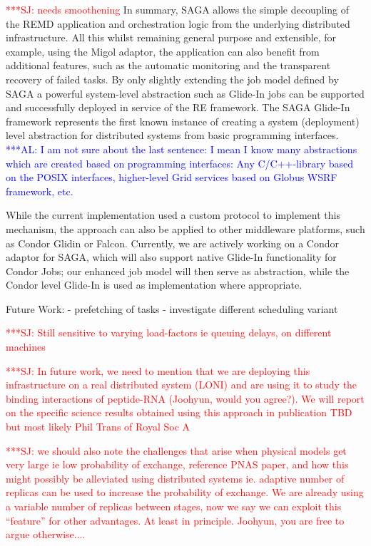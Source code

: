 \documentclass{rspublic}
\newcommand{\alnote}[1]{ {\textcolor{blue} { ***AL: #1 }}}
\newcommand{\jhanote}[1]{ {\textcolor{red} { ***SJ: #1 }}}
\newcommand{\alnote}[1]{}
\newcommand{\jhanote}[1]{}
\newcommand{\glidein}[1]{Glide-In }
\begin{document}
                                         
\jhanote{needs smoothening} In summary, SAGA allows the simple
decoupling of the REMD application and orchestration logic from the
underlying distributed infrastructure. All this whilst remaining
general purpose and extensible, for example, using the Migol adaptor,
the application can also benefit from additional features, such as the
automatic monitoring and the transparent recovery of failed tasks. By
only slightly extending the job model defined by SAGA a powerful
system-level abstraction such as \glidein\ jobs can be supported and
successfully deployed in service of the RE framework.  The SAGA
\glidein\ framework represents the first known instance of creating a
system (deployment) level abstraction for distributed systems from
basic programming interfaces.  \alnote{I am not sure about the last
  sentence: I mean I know many abstractions which are created based on
  programming interfaces: Any C/C++-library based on the POSIX
  interfaces, higher-level Grid services based on Globus WSRF
  framework, etc.}

While the current implementation used a custom protocol to implement this
mechanism, the approach can also be applied to other middleware
platforms, such as Condor Glidin or Falcon. Currently, we are actively
working on a Condor adaptor for SAGA, which will also support native
\glidein\ functionality for Condor Jobs; our enhanced job model 
will then serve as abstraction, while the Condor level 
\glidein\ is used as implementation where appropriate.

Future Work: 
- prefetching of tasks
- investigate different scheduling variant



\jhanote{Still sensitive to varying load-factors ie queuing delays, 
  on different machines}

\jhanote{In future work, we need to mention that we are deploying this
  infrastructure on a real distributed system (LONI) and are using it
  to study the binding interactions of peptide-RNA (Joohyun, would you
  agree?). We will report on the specific science results obtained
  using this approach in publication TBD but most likely Phil Trans of
  Royal Soc A}

\jhanote{we should also note the challenges that arise when physical
  models get very large ie low probability of exchange, reference PNAS
  paper, and how this might possibly be alleviated using distributed
  systems ie. adaptive number of replicas can be used to increase the
  probability of exchange. We are already using a variable number of
  replicas between stages, now we say we can exploit this ``feature''
  for other advantages. At least in principle.  Joohyun, you are free
  to argue otherwise....}
\end{document}
